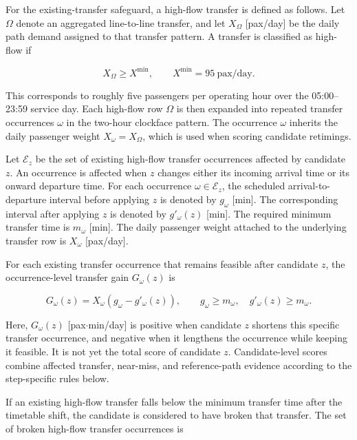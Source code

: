 \documentclass[preprint,12pt]{elsarticle}
\begin{document}
For the existing-transfer safeguard, a high-flow transfer is defined as follows. Let \(\Omega\) denote an aggregated line-to-line transfer, and let \(X_\Omega\) [pax/day] be the daily path demand assigned to that transfer pattern. A transfer is classified as high-flow if

\begin{equation}
X_\Omega \ge X^{\min},
\qquad
X^{\min}=95\ \text{pax/day}.
\label{eq:part2-high-flow-transfer-threshold}
\end{equation}

This corresponds to roughly five passengers per operating hour over the 05:00--23:59 service day. Each high-flow row \(\Omega\) is then expanded into repeated transfer occurrences \(\omega\) in the two-hour clockface pattern. The occurrence \(\omega\) inherits the daily passenger weight \(X_\omega=X_\Omega\), which is used when scoring candidate retimings.

Let \(\mathcal{E}_z\) be the set of existing high-flow transfer occurrences affected by candidate \(z\). An occurrence is affected when \(z\) changes either its incoming arrival time or its onward departure time. For each occurrence \(\omega\in\mathcal{E}_z\), the scheduled arrival-to-departure interval before applying \(z\) is denoted by \(g_\omega\) [min]. The corresponding interval after applying \(z\) is denoted by \(g'_\omega(z)\) [min]. The required minimum transfer time is \(m_\omega\) [min]. The daily passenger weight attached to the underlying transfer row is \(X_\omega\) [pax/day].

For each existing transfer occurrence that remains feasible after candidate \(z\), the occurrence-level transfer gain \(G_\omega(z)\) is

\begin{equation}
G_\omega(z)
=
X_\omega
\left(
g_\omega-g'_\omega(z)
\right),
\qquad
g_\omega\ge m_\omega,\quad
g'_\omega(z)\ge m_\omega.
\label{eq:part2-existing-transfer-gain}
\end{equation}

Here, \(G_\omega(z)\) [pax\(\cdot\)min/day] is positive when candidate \(z\) shortens this specific transfer occurrence, and negative when it lengthens the occurrence while keeping it feasible. It is not yet the total score of candidate \(z\). Candidate-level scores combine affected transfer, near-miss, and reference-path evidence according to the step-specific rules below.

If an existing high-flow transfer falls below the minimum transfer time after the timetable shift, the candidate is considered to have broken that transfer. The set of broken high-flow transfer occurrences is
\end{document}
